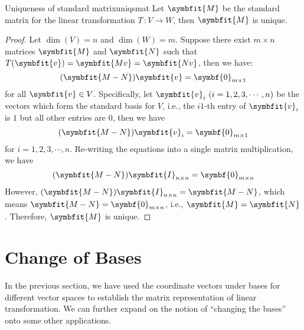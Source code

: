 \documentclass[math]{amznotes}
\theoremstyle{remark}
\begin{document}
\begin{thmbox}{Uniqueness of standard matrix}{uniqsmat}
    Let $\symbfit{M}$ be the standard matrix for the linear transformation $T \,\colon V \rightarrow W$, then $\symbfit{M}$ is unique.
    \tcblower
    \begin{proof}
        Let $\dim(V) = n$ and $\dim(W) = m$. Suppose there exist $m \times n$ matrices $\symbfit{M}$ and $\symbfit{N}$ such that $T(\symbfit{v}) = \symbfit{Mv} = \symbfit{Nv}$, then we have:
        \begin{equation*}
            (\symbfit{M - N})\symbfit{v} = \symbf{0}_{m \times 1}
        \end{equation*} 
        for all $\symbfit{v} \in V$. Specifically, let $\symbfit{v}_i \,\, (i = 1, 2, 3, \cdots, n)$ be the vectors which form the standard basis for $V$, i.e., the $i1$-th entry of $\symbfit{v}_i$ is $1$ but all other entries are $0$, then we have
        \begin{equation*}
            (\symbfit{M - N})\symbfit{v}_i = \symbf{0}_{m \times 1}
        \end{equation*} 
        for $i = 1, 2, 3, \cdots, n$. Re-writing the equations into a single matrix multiplication, we have
        \begin{equation*}
            (\symbfit{M - N})\symbfit{I}_{n \times n} = \symbf{0}_{m \times n}
        \end{equation*}
        However, $(\symbfit{M - N})\symbfit{I}_{n \times n} = \symbfit{M - N}$, which means $\symbfit{M - N} = \symbf{0}_{m \times n}$, i.e., $\symbfit{M} = \symbfit{N}$. Therefore, $\symbfit{M}$ is unique.
    \end{proof}
\end{thmbox}
\section{Change of Bases}
In the previous section, we have used the coordinate vectors under bases for different vector spaces to establish the matrix representation of linear transformation. We can further expand on the notion of ``changing the bases'' onto some other applications.
\end{document}
